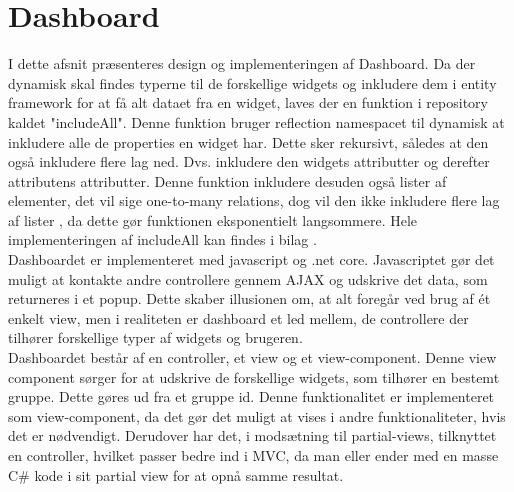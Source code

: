 \section{Dashboard}
I dette afsnit præsenteres design og implementeringen af Dashboard.
Da der dynamisk skal findes typerne til de forskellige widgets og inkludere dem i entity framework \cite{EF_core} for at få alt dataet fra en widget, laves der en funktion i repository kaldet "includeAll". Denne funktion bruger reflection namespacet \cite{Reflection} til dynamisk at inkludere alle de properties en widget har. Dette sker rekursivt, således at den også inkludere flere lag ned. Dvs. inkludere den widgets attributter og derefter attributens attributter. Denne funktion inkludere desuden også lister af elementer, det vil sige one-to-many relations, dog vil den ikke inkludere flere lag af lister , da dette gør funktionen eksponentielt langsommere. Hele implementeringen af includeAll kan findes i bilag \cite{DesignOgImplementationDashboard}. \\

\noindent Dashboardet er implementeret med javascript og .net core. Javascriptet gør det muligt at kontakte andre controllere gennem AJAX og udskrive det data, som returneres i et popup. Dette skaber illusionen om, at alt foregår ved brug af ét enkelt view, men i realiteten er dashboard et led mellem, de controllere der tilhører forskellige typer af widgets og brugeren. \\

\noindent Dashboardet består af en controller, et view og et view-component. Denne view component sørger for at udskrive de forskellige widgets, som tilhører en bestemt gruppe. Dette gøres ud fra et gruppe id. Denne funktionalitet er implementeret som view-component, da det gør det muligt at vises i andre funktionaliteter, hvis det er nødvendigt. Derudover har det, i modsætning til partial-views, tilknyttet en controller, hvilket passer bedre ind i MVC, da man eller ender med en masse C\# kode i sit partial view for at opnå samme resultat.

